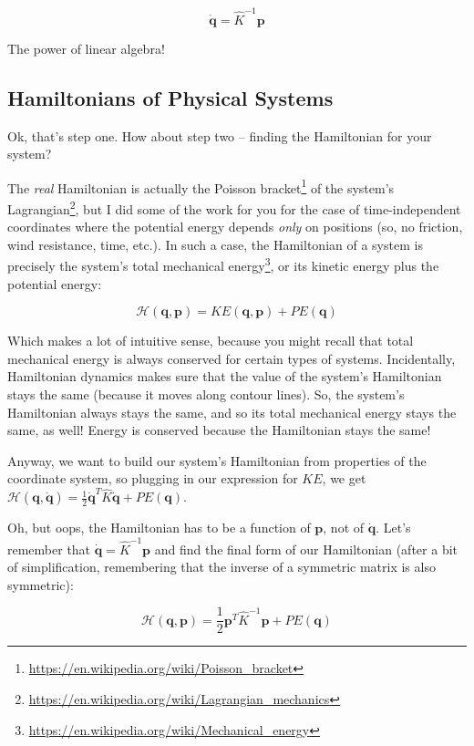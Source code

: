 \documentclass[]{article}
\renewcommand{\href}[2]{#2\footnote{\url{#1}}}
\begin{document}
\[
\dot{\mathbf{q}} = \hat{K}^{-1} \mathbf{p}
\]

The power of linear algebra!

\hypertarget{hamiltonians-of-physical-systems}{%
\subsection{Hamiltonians of Physical
Systems}\label{hamiltonians-of-physical-systems}}

Ok, that's step one. How about step two -- finding the Hamiltonian for your
system?

The \emph{real} Hamiltonian is actually the
\href{https://en.wikipedia.org/wiki/Poisson_bracket}{Poisson bracket} of the
system's \href{https://en.wikipedia.org/wiki/Lagrangian_mechanics}{Lagrangian},
but I did some of the work for you for the case of time-independent coordinates
where the potential energy depends \emph{only} on positions (so, no friction,
wind resistance, time, etc.). In such a case, the Hamiltonian of a system is
precisely the system's total
\href{https://en.wikipedia.org/wiki/Mechanical_energy}{mechanical energy}, or
its kinetic energy plus the potential energy:

\[
\mathcal{H}(\mathbf{q},\mathbf{p}) = KE(\mathbf{q},\mathbf{p}) + PE(\mathbf{q})
\]

Which makes a lot of intuitive sense, because you might recall that total
mechanical energy is always conserved for certain types of systems.
Incidentally, Hamiltonian dynamics makes sure that the value of the system's
Hamiltonian stays the same (because it moves along contour lines). So, the
system's Hamiltonian always stays the same, and so its total mechanical energy
stays the same, as well! Energy is conserved because the Hamiltonian stays the
same!

Anyway, we want to build our system's Hamiltonian from properties of the
coordinate system, so plugging in our expression for \(KE\), we get
\(\mathcal{H}(\mathbf{q},\dot{\mathbf{q}}) = \frac{1}{2} \dot{\mathbf{q}}^T \hat{K} \dot{\mathbf{q}} + PE(\mathbf{q})\).

Oh, but oops, the Hamiltonian has to be a function of \(\mathbf{p}\), not of
\(\dot{\mathbf{q}}\). Let's remember that
\(\dot{\mathbf{q}} = \hat{K}^{-1} \mathbf{p}\) and find the final form of our
Hamiltonian (after a bit of simplification, remembering that the inverse of a
symmetric matrix is also symmetric):

\[
\mathcal{H}(\mathbf{q},\mathbf{p}) = \frac{1}{2} \mathbf{p}^T \hat{K}^{-1} \mathbf{p} + PE(\mathbf{q})
\]
\end{document}
